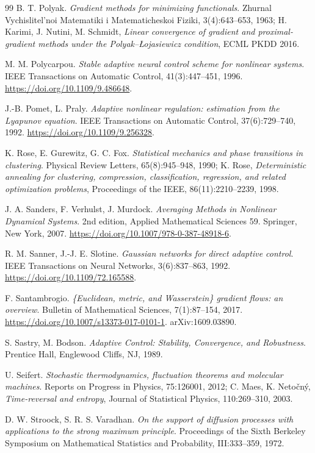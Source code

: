 \begin{thebibliography}{99}
B. T. Polyak.
\emph{Gradient methods for minimizing functionals}.
Zhurnal Vychislitel'noi Matematiki i Matematicheskoi Fiziki, 3(4):643--653, 1963;
H. Karimi, J. Nutini, M. Schmidt, \emph{Linear convergence of gradient and proximal-gradient methods under the
Polyak--{\L}ojasiewicz condition}, ECML PKDD 2016.

M. M. Polycarpou.
\emph{Stable adaptive neural control scheme for nonlinear systems}.
IEEE Transactions on Automatic Control, 41(3):447--451, 1996.
\url{https://doi.org/10.1109/9.486648}.

J.-B. Pomet, L. Praly.
\emph{Adaptive nonlinear regulation: estimation from the Lyapunov equation}.
IEEE Transactions on Automatic Control, 37(6):729--740, 1992.
\url{https://doi.org/10.1109/9.256328}.

K. Rose, E. Gurewitz, G. C. Fox.
\emph{Statistical mechanics and phase transitions in clustering}.
Physical Review Letters, 65(8):945--948, 1990;
K. Rose, \emph{Deterministic annealing for clustering, compression, classification, regression, and related
optimization problems}, Proceedings of the IEEE, 86(11):2210--2239, 1998.

J. A. Sanders, F. Verhulst, J. Murdock.
\emph{Averaging Methods in Nonlinear Dynamical Systems}.
2nd edition, Applied Mathematical Sciences 59. Springer, New York, 2007.
\url{https://doi.org/10.1007/978-0-387-48918-6}.

R. M. Sanner, J.-J. E. Slotine.
\emph{Gaussian networks for direct adaptive control}.
IEEE Transactions on Neural Networks, 3(6):837--863, 1992.
\url{https://doi.org/10.1109/72.165588}.

F. Santambrogio.
\emph{\{Euclidean, metric, and Wasserstein\} gradient flows: an overview}.
Bulletin of Mathematical Sciences, 7(1):87--154, 2017.
\url{https://doi.org/10.1007/s13373-017-0101-1}.
arXiv:1609.03890.

S. Sastry, M. Bodson.
\emph{Adaptive Control: Stability, Convergence, and Robustness}.
Prentice Hall, Englewood Cliffs, NJ, 1989.

U. Seifert.
\emph{Stochastic thermodynamics, fluctuation theorems and molecular machines}.
Reports on Progress in Physics, 75:126001, 2012;
C. Maes, K. Neto\v{c}n\'y, \emph{Time-reversal and entropy}, Journal of Statistical Physics, 110:269--310, 2003.

D. W. Stroock, S. R. S. Varadhan.
\emph{On the support of diffusion processes with applications to the strong maximum principle}.
Proceedings of the Sixth Berkeley Symposium on Mathematical Statistics and Probability, III:333--359, 1972.


\end{thebibliography}
